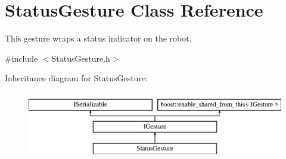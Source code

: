 \hypertarget{class_status_gesture}{}\section{Status\+Gesture Class Reference}
\label{class_status_gesture}


This gesture wraps a status indicator on the robot.  




{\ttfamily \#include $<$Status\+Gesture.\+h$>$}

Inheritance diagram for Status\+Gesture\+:\begin{figure}[H]
\begin{center}
\leavevmode
\includegraphics[height=3.000000cm]{class_status_gesture}
\end{center}
\end{figure}
